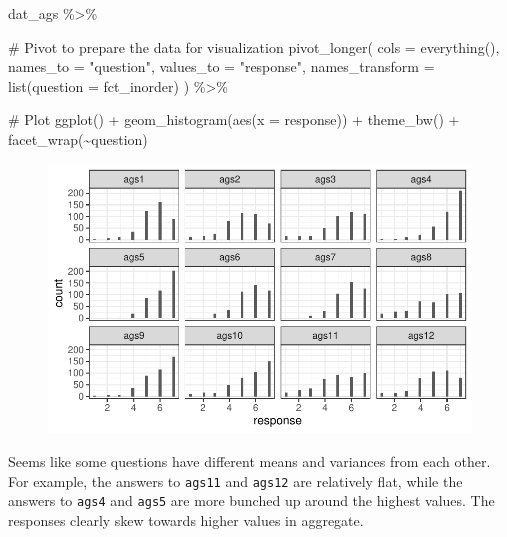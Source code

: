 \documentclass[
  letterpaper,
  DIV=11,
  numbers=noendperiod]{scrreprt}
\newenvironment{Shaded}{\begin{snugshade}}{\end{snugshade}}
\newcommand{\AttributeTok}[1]{\textcolor[rgb]{0.40,0.45,0.13}{#1}}
\newcommand{\CommentTok}[1]{\textcolor[rgb]{0.37,0.37,0.37}{#1}}
\newcommand{\FunctionTok}[1]{\textcolor[rgb]{0.28,0.35,0.67}{#1}}
\newcommand{\NormalTok}[1]{\textcolor[rgb]{0.00,0.23,0.31}{#1}}
\newcommand{\SpecialCharTok}[1]{\textcolor[rgb]{0.37,0.37,0.37}{#1}}
\newcommand{\StringTok}[1]{\textcolor[rgb]{0.13,0.47,0.30}{#1}}
\begin{document}
\begin{Shaded}
\begin{Highlighting}[]
\NormalTok{dat\_ags }\SpecialCharTok{\%\textgreater{}\%} 

  \CommentTok{\# Pivot to prepare the data for visualization}
  \FunctionTok{pivot\_longer}\NormalTok{(}
    \AttributeTok{cols      =} \FunctionTok{everything}\NormalTok{(),}
    \AttributeTok{names\_to  =} \StringTok{"question"}\NormalTok{,}
    \AttributeTok{values\_to =} \StringTok{"response"}\NormalTok{,}
    \AttributeTok{names\_transform =} \FunctionTok{list}\NormalTok{(}\AttributeTok{question =}\NormalTok{ fct\_inorder)  }
\NormalTok{  ) }\SpecialCharTok{\%\textgreater{}\%} 

  \CommentTok{\# Plot}
  \FunctionTok{ggplot}\NormalTok{() }\SpecialCharTok{+}
  \FunctionTok{geom\_histogram}\NormalTok{(}\FunctionTok{aes}\NormalTok{(}\AttributeTok{x =}\NormalTok{ response)) }\SpecialCharTok{+} 
  \FunctionTok{theme\_bw}\NormalTok{() }\SpecialCharTok{+} 
  \FunctionTok{facet\_wrap}\NormalTok{(}\SpecialCharTok{\textasciitilde{}}\NormalTok{question)}
\end{Highlighting}
\end{Shaded}

\begin{figure}[H]

{\centering \includegraphics{./traditional-cfa-workflow_files/figure-pdf/unnamed-chunk-3-1.pdf}

}

\end{figure}

Seems like some questions have different means and variances from each
other. For example, the answers to \texttt{ags11} and \texttt{ags12} are
relatively flat, while the answers to \texttt{ags4} and \texttt{ags5}
are more bunched up around the highest values. The responses clearly
skew towards higher values in aggregate.
\end{document}
